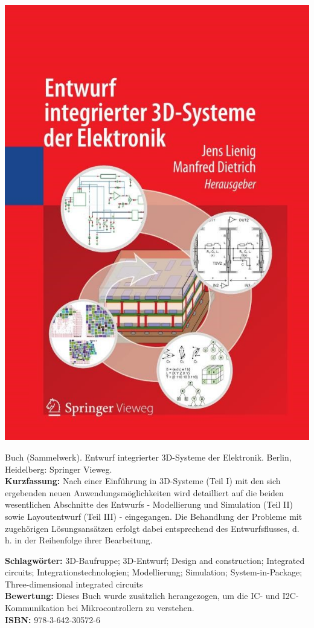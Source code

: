{
\begin{minipage}{0.38\textwidth}
	\includegraphics[width=\linewidth]{images/Lienig.jpg}
\end{minipage}
\hfill
\begin{minipage}{0.6\textwidth}
Buch (Sammelwerk). Entwurf integrierter 3D-Systeme der Elektronik.
Berlin, Heidelberg: Springer Vieweg.
\\ \textbf{Kurzfassung:}
Nach einer Einführung in 3D-Systeme (Teil I) mit den sich ergebenden neuen Anwendungsmöglichkeiten wird detailliert auf die beiden wesentlichen Abschnitte des Entwurfs - Modellierung und Simulation (Teil II) sowie Layoutentwurf (Teil III) - eingegangen. Die Behandlung der Probleme mit zugehörigen Lösungsansätzen erfolgt dabei entsprechend des Entwurfsflusses, d. h. in der Reihenfolge ihrer Bearbeitung.
\end{minipage}
\textbf{Schlagwörter:}
3D-Baufruppe; 3D-Entwurf; Design and construction; Integrated circuits; Integrationstechnologien; Modellierung; Simulation; System-in-Package; Three-dimensional integrated circuits
\\ \textbf{Bewertung:}
Dieses Buch wurde zusätzlich herangezogen, um die IC- und I2C-Kommunikation bei Mikrocontrollern zu verstehen.
\\ \textbf{ISBN:}
978-3-642-30572-6
}
